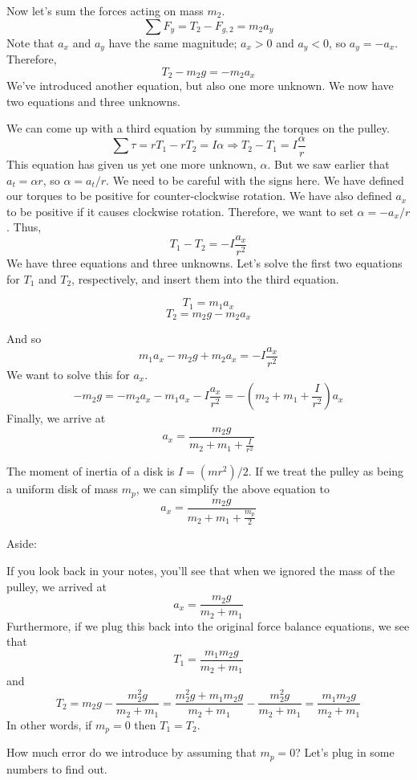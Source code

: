 Now let's sum the forces acting on mass $m_2$.
$$\sum F_y=T_2-F_{g,2}=m_2a_y$$
Note that $a_x$ and $a_y$ have the same magnitude; $a_x>0$ and $a_y<0$, so $a_y=-a_x$. Therefore,
\begin{equation}T_2-m_2g=-m_2a_x\end{equation}
We've introduced another equation, but also one more unknown. We now have two equations and three unknowns.

We can come up with a third equation by summing the torques on the pulley.
$$\sum \tau=rT_1-rT_2=I\alpha\Rightarrow T_2-T_1=I\frac{\alpha}{r}$$
This equation has given us yet one more unknown, $\alpha$. But we saw earlier that $a_t=\alpha r$, so $\alpha=a_t/r$. We need to be careful with the signs here. We have defined our torques to be positive for counter-clockwise rotation. We have also defined $a_x$ to be positive if it causes clockwise rotation. Therefore, we want to set $\alpha=-a_x/r$. Thus,
\begin{equation}T_1-T_2=-I\frac{a_x}{r^2}\end{equation}
We have three equations and three unknowns. Let's solve the first two equations for $T_1$ and $T_2$, respectively, and insert them into the third equation.

$$T_1=m_1a_x$$
$$T_2=m_2g-m_2a_x$$

And so
$$m_1a_x-m_2g+m_2a_x=-I\frac{a_x}{r^2}$$
We want to solve this for $a_x$.
$$-m_2g=-m_2a_x-m_1a_x-I\frac{a_x}{r^2}=-\left(m_2+m_1+\frac{I}{r^2}\right)a_x$$
Finally, we arrive at
$${a_x=\frac{m_2g}{m_2+m_1+\frac{I}{r^2}}}$$

The moment of inertia of a disk is $I=(mr^2)/2$. If we treat the pulley as being a uniform disk of mass $m_p$, we can simplify the above equation to 
\begin{equation}\boxed{a_x=\frac{m_2g}{m_2+m_1+\frac{m_p}{2}}}\end{equation}

Aside:

If you look back in your notes, you'll see that when we ignored the mass of the pulley, we arrived at
$$a_x=\frac{m_2g}{m_2+m_1}$$
Furthermore, if we plug this back into the original force balance equations, we see that 
$$T_1=\frac{m_1m_2g}{m_2+m_1}$$
and
$$T_2=m_2g-\frac{m_2^2g}{m_2+m_1}=\frac{m_2^2g+m_1m_2g}{m_2+m_1}-\frac{m_2^2g}{m_2+m_1}=\frac{m_1m_2g}{m_2+m_1}$$
In other words, if $m_p=0$ then $T_1=T_2$.

How much error do we introduce by assuming that $m_p=0$? Let's plug in some numbers to find out.


